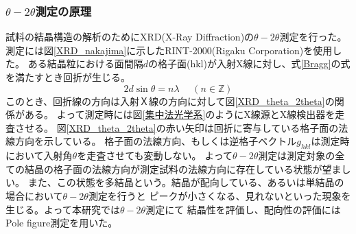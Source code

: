 \documentclass[dvipdfmx,12pt,a4paper]{jreport}
\begin{document}
			\subsubsection{$\theta - 2\theta$測定の原理}
			試料の結晶構造の解析のためにXRD(X-Ray Diffraction)の$\theta-2\theta$測定を行った。
			測定には図\ref{XRD_nakajima}に示したRINT-2000(Rigaku Corporation)を使用した。
			ある結晶粒における面間隔$d$の格子面(hkl)が入射X線に対し、式\eqref{Bragg}の式を満たすとき回折が生じる。
			\begin{equation}
				2d \sin \theta = n \lambda \ \ \ \ \ \ (n\in \mathbb{Z})
				\label{Bragg}
			\end{equation}
			このとき、回折線の方向は入射Ｘ線の方向に対して図\ref{XRD_theta_2theta}の関係がある。
			よって測定時には図\ref{集中法光学系}のようにX線源とX線検出器を走査させる。
			図\ref{XRD_theta_2theta}の赤い矢印は回折に寄与している格子面の法線方向を示している。
			格子面の法線方向、もしくは逆格子ベクトル$g_{hkl}$は測定時において入射角$\theta$を走査させても変動しない。
			よって$\theta-2\theta$測定は測定対象の全ての結晶の格子面の法線方向が測定試料の法線方向に存在している状態が望ましい。
			また、この状態を多結晶という。結晶が配向している、あるいは単結晶の場合において$\theta-2\theta$測定を行うと
			ピークが小さくなる、見れないといった現象を生じる。よって本研究では$\theta-2\theta$測定にて
			結晶性を評価し、配向性の評価にはPole figure測定を用いた。
\end{document}
